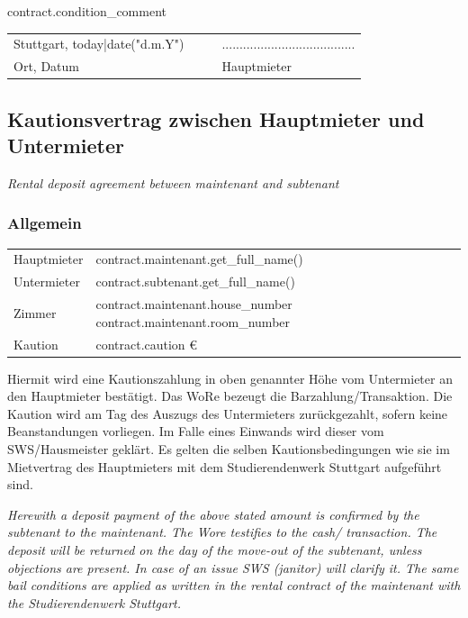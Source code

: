 \documentclass[9pt,pdftex,a4paper]{article}
\newcommand{\signLine}{......................................}
\begin{document}
{{{{{ contract.condition_comment }}

{%

\vfill

\begin{tabularx}{\textwidth}{@{}YYYY@{}}
Stuttgart, {{ today|date("d.m.Y") }} &  &  & \signLine\\
Ort, Datum &  &  & Hauptmieter\\
\end{tabularx}

%
%

{%

\newpage

\subsection*{Kautionsvertrag zwischen Hauptmieter und Untermieter}
\textit{Rental deposit agreement between maintenant and subtenant}

\subsubsection*{Allgemein}
\begin{tabularx}{\textwidth}{XX}
Hauptmieter & {{ contract.maintenant.get_full_name() }}\\
Untermieter &  {{ contract.subtenant.get_full_name() }}\\
Zimmer & {{ contract.maintenant.house_number }} {{ contract.maintenant.room_number }}\\
Kaution & {{ contract.caution }}€\\
\end{tabularx}\bigskip

Hiermit wird eine Kautionszahlung in oben genannter Höhe vom Untermieter an den Hauptmieter bestätigt.
Das WoRe bezeugt die Barzahlung/Transaktion.
Die Kaution wird am Tag des Auszugs des Untermieters zurückgezahlt, sofern keine Beanstandungen vorliegen.
Im Falle eines Einwands wird dieser vom SWS/Hausmeister geklärt.
Es gelten die selben Kautionsbedingungen wie sie im Mietvertrag des Hauptmieters mit dem Studierendenwerk Stuttgart aufgeführt sind.\bigskip

\textit{Herewith a deposit payment of the above stated amount is confirmed by the subtenant to the maintenant.
The Wore testifies to the cash/ transaction.
The deposit will be returned on the day of the move-out of the  subtenant, unless objections are present.
In case of an issue SWS (janitor) will clarify it.
The same bail conditions are applied as written in the rental contract of the maintenant with the Studierendenwerk Stuttgart.}

}}}}}
\end{document}
